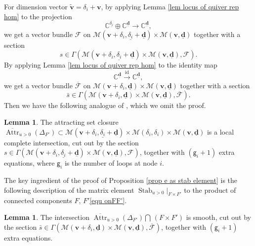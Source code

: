 \documentclass[10pt]{amsart}
\theoremstyle{definition}
\newtheorem{Lemma}[Theorem]{Lemma}
\numberwithin{equation}{section}
\newcommand{\bC}{\mathbb{C}}
\newcommand{\bv}{\mathbf{v}}
\newcommand{\bd}{\mathbf{d}}
\newcommand{\cM}{\mathcal{M}}
\newcommand{\Attr}{\operatorname{Attr}}
\newcommand{\Stab}{\operatorname{Stab}}
\newcommand{\id}{\operatorname{id}}
\begin{document}
For dimension vector $\widetilde{\bv}=\delta_i+\bv$, 
by applying Lemma \ref{lem locus of quiver rep hom} to the projection $$\bC^{\underline{\delta_i}}\oplus\bC^{\underline{\bd}}\to \bC^{\underline{\bd}},$$ 
we get a vector bundle $\mathcal F$ on $\cM(\bv+\delta_i,\underline{\delta_i}+\underline{\bd})\times\cM(\bv,\underline{\bd})$ together with a section $$s\in \Gamma( \cM(\bv+\delta_i,\underline{\delta_i}+\underline{\bd})\times\cM(\bv,\underline{\bd}),\mathcal F).$$ 
By applying Lemma \ref{lem locus of quiver rep hom} to the identity map $$\bC^{\underline{\bd}}\xrightarrow{\id} \bC^{\underline{\bd}},$$ 
we get a vector bundle $\overline{\mathcal F}$ on $\cM(\bv+\delta_i,\underline{\bd})\times\cM(\bv,\underline{\bd})$ together with a section 
$$\bar s\in \Gamma( \cM(\bv+\delta_i,\underline{\bd})\times\cM(\bv,\underline{\bd}),\overline{\mathcal F}).$$ Then we have the following analogue of \cite[Claim 3.17]{N2}, 
which we omit the proof.
\begin{Lemma}\label{lem attr closure is lci}
The attracting set closure $\overline{\Attr}_{u>0}(\Delta_{F'})\subset \cM(\bv+\delta_i,\underline{\delta_i}+\underline{\bd})\times \cM(\delta_i,\delta_i)\times \cM(\bv,\underline{\bd})$ is a local complete intersection, cut out by the section $s\in \Gamma( \cM(\bv+\delta_i,\underline{\delta_i}+\underline{\bd})\times\cM(\bv,\underline{\bd}),\mathcal F)$, together with $(\mathsf g_i+1)$ extra equations, where $\mathsf g_i$ is the number of loops at node $i$.
\end{Lemma}
The key ingredient of the proof of Proposition \ref{prop e as stab element} is the following description of the matrix element $\Stab_{u>0}\big|_{F\times F'}$ to the product of connected components $F$, $F'$\eqref{equ onFF'}.

\begin{Lemma}\label{lem stab matrix element}
The intersection $\overline{\Attr}_{u>0}(\Delta_{F'})\bigcap\,(F\times F')$ is smooth, cut out by the section $\bar s\in \Gamma( \cM(\bv+\delta_i,\underline{\bd})\times\cM(\bv,\underline{\bd}),\overline{\mathcal F})$, together with $(\mathsf g_i+1)$ extra equations.
\end{Lemma}
\end{document}
